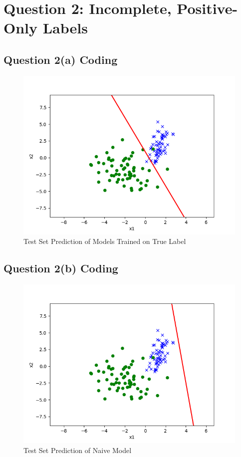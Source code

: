 \documentclass[11pt]{article}
\begin{document}
	\newpage
	\section{Question 2: Incomplete, Positive-Only Labels}
	\subsection{Question 2(a) Coding}
	\begin{figure}[h]
		\centering
		\includegraphics[width=0.6\linewidth]{src/posonly/posonly_true_pred.png}
		\caption{Test Set Prediction of Models Trained on True Label}
	\end{figure}
	
	\subsection{Question 2(b) Coding}
	\begin{figure}[h]
		\centering
		\includegraphics[width=0.6\linewidth]{src/posonly/posonly_naive_pred.png}
		\caption{Test Set Prediction of Naive Model}
	\end{figure}
	
\end{document}
